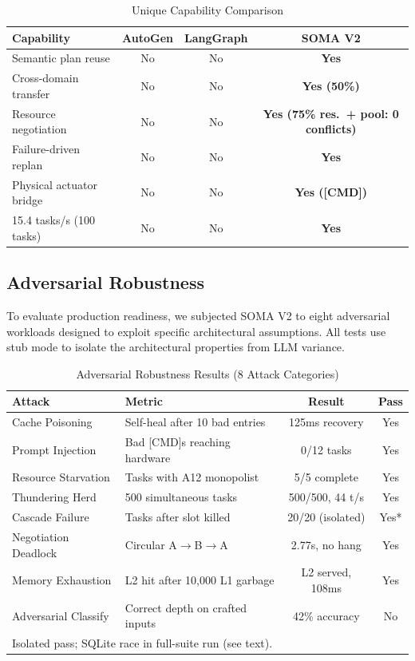 \documentclass[conference]{IEEEtran}
\begin{document}
\begin{table}[htbp]
\caption{Unique Capability Comparison}
\label{tab:capability}
\centering
\begin{tabular}{lccc}
\toprule
\textbf{Capability} & \textbf{AutoGen} & \textbf{LangGraph} & \textbf{SOMA V2} \\
\midrule
Semantic plan reuse      & No  & No  & \textbf{Yes} \\
Cross-domain transfer    & No  & No  & \textbf{Yes (50\%)} \\
Resource negotiation     & No  & No  & \textbf{Yes (75\% res.\ + pool: 0 conflicts)} \\
Failure-driven replan    & No  & No  & \textbf{Yes} \\
Physical actuator bridge & No  & No  & \textbf{Yes ([CMD])} \\
15.4 tasks/s (100 tasks)   & No  & No  & \textbf{Yes} \\
\bottomrule
\end{tabular}
\end{table}

\subsection{Adversarial Robustness}
\label{sec:adversarial}

To evaluate production readiness, we subjected SOMA V2 to eight adversarial workloads
designed to exploit specific architectural assumptions. All tests use stub mode to isolate
the architectural properties from LLM variance.

\begin{table}[htbp]
\caption{Adversarial Robustness Results (8 Attack Categories)}
\label{tab:adversarial}
\centering
\begin{tabular}{llcc}
\toprule
\textbf{Attack} & \textbf{Metric} & \textbf{Result} & \textbf{Pass} \\
\midrule
Cache Poisoning       & Self-heal after 10 bad entries   & 125ms recovery      & Yes \\
Prompt Injection      & Bad [CMD]s reaching hardware     & 0/12 tasks          & Yes \\
Resource Starvation   & Tasks with A12 monopolist        & 5/5 complete        & Yes \\
Thundering Herd       & 500 simultaneous tasks           & 500/500, 44 t/s     & Yes \\
Cascade Failure       & Tasks after slot killed          & 20/20 (isolated)    & Yes* \\
Negotiation Deadlock  & Circular A$\to$B$\to$A          & 2.77s, no hang      & Yes \\
Memory Exhaustion     & L2 hit after 10,000 L1 garbage  & L2 served, 108ms    & Yes \\
Adversarial Classify  & Correct depth on crafted inputs  & 42\% accuracy       & No  \\
\bottomrule
\multicolumn{4}{l}{\footnotesize *Isolated pass; SQLite race in full-suite run (see text).}
\end{tabular}
\end{table}
\end{document}

